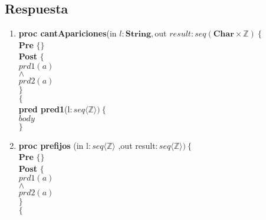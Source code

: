 \documentclass[a4paper]{article}
\begin{document}
\subsection*{Respuesta}
	\begin{enumerate}[label=\alph*)]
		\item
			
			\textbf{proc cantApariciones}(in $l:\textbf{String},$out $result :
			 seq(\textbf{Char}\times \mathbb{Z})\ \{$\smallskip \\
			\hspace*{6mm} \textbf{Pre }$\{ \}$\smallskip \\
			\hspace*{6mm} \textbf{Post }$\{$\\
			\hspace*{6mm} $prd1(a)$\\
			\hspace*{6mm} $\wedge$\\
			\hspace*{6mm} $prd2(a)$\\
			\hspace*{6mm} $\}$\\
			$\{$\smallskip \\
			
			\textbf{pred pred1}(l$: seq\langle \mathbb{Z}\rangle)\ \{$\smallskip \\
			\hspace*{6mm}$body$\\
			$\}$			
			
		\item
			
			\textbf{proc prefijos }(in l$:seq\langle \mathbb{Z}\rangle$
				,out result$:seq\langle \mathbb{Z}\rangle )\ \{$\smallskip \\
			\hspace*{6mm} \textbf{Pre }$\{ \}$\smallskip \\
			\hspace*{6mm} \textbf{Post }$\{$\\
			\hspace*{6mm} $prd1(a)$\\
			\hspace*{6mm} $\wedge$\\
			\hspace*{6mm} $prd2(a)$\\
			\hspace*{6mm} $\}$\\
			$\{$\smallskip \\
			

\end{enumerate}
\end{document}

